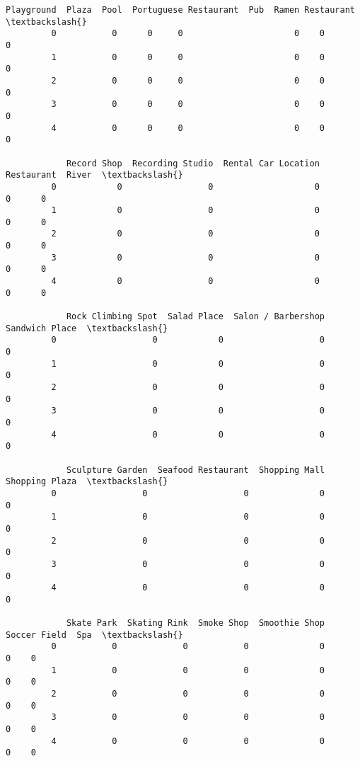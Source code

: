\documentclass[11pt]{article}
\begin{document}
\begin{Verbatim}[commandchars=\\\{\}]
            Playground  Plaza  Pool  Portuguese Restaurant  Pub  Ramen Restaurant  \textbackslash{}
         0           0      0     0                      0    0                 0   
         1           0      0     0                      0    0                 0   
         2           0      0     0                      0    0                 0   
         3           0      0     0                      0    0                 0   
         4           0      0     0                      0    0                 0   
         
            Record Shop  Recording Studio  Rental Car Location  Restaurant  River  \textbackslash{}
         0            0                 0                    0           0      0   
         1            0                 0                    0           0      0   
         2            0                 0                    0           0      0   
         3            0                 0                    0           0      0   
         4            0                 0                    0           0      0   
         
            Rock Climbing Spot  Salad Place  Salon / Barbershop  Sandwich Place  \textbackslash{}
         0                   0            0                   0               0   
         1                   0            0                   0               0   
         2                   0            0                   0               0   
         3                   0            0                   0               0   
         4                   0            0                   0               0   
         
            Sculpture Garden  Seafood Restaurant  Shopping Mall  Shopping Plaza  \textbackslash{}
         0                 0                   0              0               0   
         1                 0                   0              0               0   
         2                 0                   0              0               0   
         3                 0                   0              0               0   
         4                 0                   0              0               0   
         
            Skate Park  Skating Rink  Smoke Shop  Smoothie Shop  Soccer Field  Spa  \textbackslash{}
         0           0             0           0              0             0    0   
         1           0             0           0              0             0    0   
         2           0             0           0              0             0    0   
         3           0             0           0              0             0    0   
         4           0             0           0              0             0    0   
         

\end{Verbatim}
\end{document}
